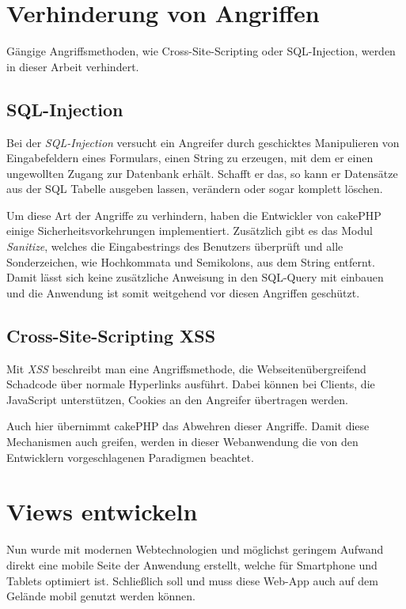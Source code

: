 \section{Verhinderung von Angriffen}
Gängige Angriffsmethoden, wie Cross-Site-Scripting oder SQL-Injection, werden in dieser Arbeit verhindert.

\subsection{SQL-Injection}
Bei der \emph{SQL-Injection} versucht ein Angreifer durch geschicktes Manipulieren von Eingabefeldern eines Formulars, einen String zu erzeugen, mit dem er einen ungewollten Zugang zur Datenbank erhält. Schafft er das, so kann er Datensätze aus der SQL Tabelle ausgeben lassen, verändern oder sogar komplett löschen.\par

Um diese Art der Angriffe zu verhindern, haben die Entwickler von cakePHP einige Sicherheitsvorkehrungen implementiert. Zusätzlich gibt es das Modul \emph{Sanitize}, welches die Eingabestrings des Benutzers überprüft und alle Sonderzeichen, wie Hochkommata und Semikolons, aus dem String entfernt. Damit lässt sich keine zusätzliche Anweisung in den SQL-Query mit einbauen und die Anwendung ist somit weitgehend vor diesen Angriffen geschützt.

\subsection{Cross-Site-Scripting XSS}
Mit \emph{XSS} beschreibt man eine Angriffsmethode, die Webseitenübergreifend Schadcode über normale Hyperlinks ausführt. Dabei können bei Clients, die JavaScript unterstützen, Cookies an den Angreifer übertragen werden.\par

Auch hier übernimmt cakePHP das Abwehren dieser Angriffe. Damit diese Mechanismen auch greifen, werden in dieser Webanwendung die von den Entwicklern vorgeschlagenen Paradigmen beachtet.


\section{Views entwickeln}
Nun wurde mit modernen Webtechnologien und möglichst geringem Aufwand direkt eine mobile Seite der Anwendung erstellt, welche für Smartphone und Tablets optimiert ist. Schließlich soll und muss diese Web-App auch auf dem Gelände mobil genutzt werden können.\par

